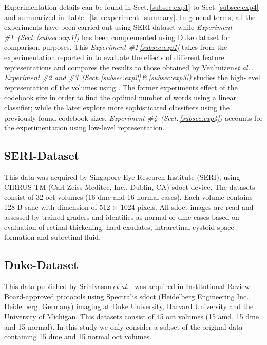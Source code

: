 Experimentation details can be found in Sect.\,\ref{subsec:exp1} to Sect.\,\ref{subsec:exp4} and summarized in Table.~\ref{tab:experiment_summary}.
In general terms, all the experiments have been carried out using SERI dataset while \emph{Experiment \#1~(Sect.\,\ref{subsec:exp1})} has been complemented using Duke dataset for comparison purposes. This \emph{Experiment \#1\,\cref{subsec:exp1}} takes from the experimentation reported in \cite{Lemaintre2015miccaiOCT} to evaluate the effects of different feature representations and compares the results to those obtained by Venhuizen\emph{et al.}\,\cite{Venhuizen2015}.
\emph{Experiment \#2 and \#3~(Sect.\,\ref{subsec:exp2}\,\&\,\ref{subsec:exp3})} studies the high-level representation of the volumes using \bow. The former experiments effect of the codebook size in order to find the optimal number of words using a linear classifier; while the later explore more sophisticated classifiers using the previously found codebook sizes.
\emph{Experiment \#4~(Sect.\,\ref{subsec:exp4})} accounts for the experimentation using low-level representation.



\subsection{SERI-Dataset}\label{sec:exp:dataset:seri}
This data was acquired by Singapore Eye Research Institute (SERI), using CIRRUS TM (Carl Zeiss Meditec, Inc., Dublin, CA) \ac{sdoct} device. The datasets consist of 32 \ac{oct} volumes (16 \ac{dme} and 16 normal cases). Each volume contains 128 B-sane with  dimension of 512 $\times$ 1024 pixels.  All \ac{sdoct} images are read and assessed by trained graders and identifies as normal or \ac{dme} cases based on evaluation of retinal thickening, hard exudates, intraretinal cystoid space formation and subretinal fluid.

\subsection{Duke-Dataset} \label{sec:exp:dataset:duke}
This data published by Srinivasan\,\emph{et al.}~\cite{Srinivasan2014} was acquired in Institutional Review Board-approved protocols using Spectralis \ac{sdoct} (Heidelberg Engineering Inc., Heidelberg, Germany) imaging at Duke University, Harvard University and the University of Michigan. This datasets consist of 45 \ac{oct} volumes (15 \ac{amd}, 15 \ac{dme} and 15 normal). In this study we only consider a subset of the original data containing 15 \ac{dme} and 15 normal \ac{oct} volumes.


